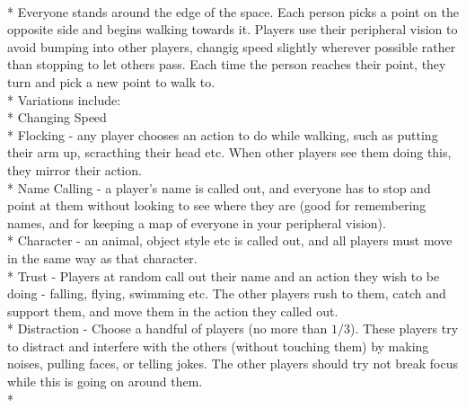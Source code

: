 \begin{minipage}{\textwidth}
\\*
Everyone stands around the edge of the space.  Each person picks a point on the opposite side and begins walking towards it.  Players use their peripheral vision to avoid bumping into other players, changig speed slightly wherever possible rather than stopping to let others pass.  Each time the person reaches their point, they turn and pick a new point to walk to.\\*
Variations include:\\*
Changing Speed\\*
Flocking - any player chooses an action to do while walking, such as putting their arm up, scracthing their head etc.  When other players see them doing this, they mirror their action.\\*
Name Calling - a player's name is called out, and everyone has to stop and point at them without looking to see where they are (good for remembering names, and for keeping a map of everyone in your peripheral vision).\\*
Character - an animal, object style etc is called out, and all players must move in the same way as that character.\\*
Trust - Players at random call out their name and an action they wish to be doing - falling, flying, swimming etc.  The other players rush to them, catch and support them, and move them in the action they called out.\\*
Distraction - Choose a handful of players (no more than $1/3$).  These players try to distract and interfere with the others (without touching them) by making noises, pulling faces, or telling jokes.  The other players should try not break focus while this is going on around them.\\*
\end{minipage}    \vfill
